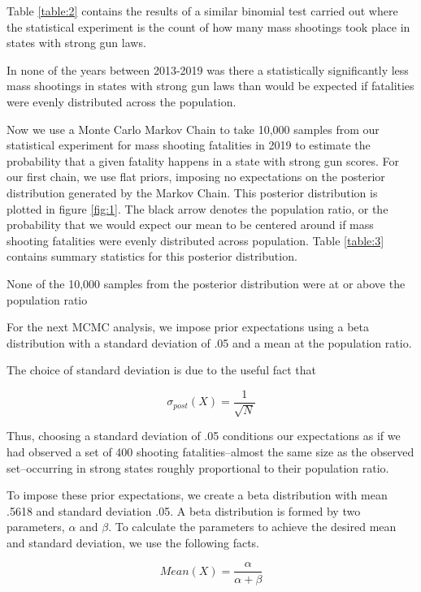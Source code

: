 \documentclass{article}
\begin{document}
Table \ref{table:2} contains the results of a similar binomial test carried out where the statistical experiment is the count of how many mass shootings took place in states with strong gun laws. 

In none of the years between 2013-2019 was there a statistically significantly less mass shootings in states with strong gun laws than would be expected if fatalities were evenly distributed across the population. 

Now we use a Monte Carlo Markov Chain to take 10,000 samples from our statistical experiment for mass shooting fatalities in 2019 to estimate the probability that a given fatality happens in a state with strong gun scores. For our first chain, we use flat priors, imposing no expectations on the posterior distribution generated by the Markov Chain. This posterior distribution is plotted in figure \ref{fig:1}. The black arrow denotes the population ratio, or the probability that we would expect our mean to be centered around if mass shooting fatalities were evenly distributed across population. Table \ref{table:3} contains summary statistics for this posterior distribution.

None of the 10,000 samples from the posterior distribution were at or above the population ratio

For the next MCMC analysis, we impose prior expectations using a beta distribution with a standard deviation of .05 and a mean at the population ratio. 

The choice of standard deviation is due to the useful fact that

\begin{equation}
\sigma_{post}(X) = \frac{1}{\sqrt{N}}
\end{equation}

Thus, choosing a standard deviation of .05 conditions our expectations as if we had observed a set of 400 shooting fatalities--almost the same size as the observed set--occurring in strong states roughly proportional to their population ratio. 

To impose these prior expectations, we create a beta distribution with mean .5618 and standard deviation .05. A beta distribution is formed by two parameters, $\alpha $ and $\beta$. To calculate the parameters to achieve the desired mean and standard deviation, we use the following facts.

\begin{equation}
Mean(X) = \frac{\alpha}{\alpha + \beta}
\end{equation}
\end{document}
